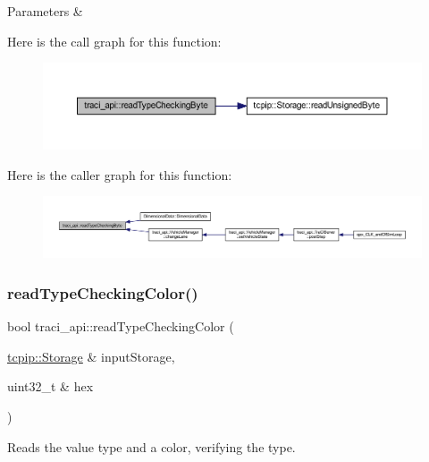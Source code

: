 \begin{DoxyParams}{Parameters}
{\em } & \\
\hline
\end{DoxyParams}
Here is the call graph for this function\+:
\nopagebreak
\begin{figure}[H]
\begin{center}
\leavevmode
\includegraphics[width=350pt]{namespacetraci__api_aee58441392da7b83ecd8c8831271e945_cgraph}
\end{center}
\end{figure}
Here is the caller graph for this function\+:
\nopagebreak
\begin{figure}[H]
\begin{center}
\leavevmode
\includegraphics[width=350pt]{namespacetraci__api_aee58441392da7b83ecd8c8831271e945_icgraph}
\end{center}
\end{figure}
\mbox{\label{namespacetraci__api_af8c7656fbd212acb13f037d4fb20f1f7}} 
\subsubsection{\texorpdfstring{read\+Type\+Checking\+Color()}{readTypeCheckingColor()}}
{\footnotesize\ttfamily bool traci\+\_\+api\+::read\+Type\+Checking\+Color (\begin{DoxyParamCaption}\item[{\hyperlink{classtcpip_1_1_storage}{tcpip\+::\+Storage} \&}]{input\+Storage,  }\item[{uint32\+\_\+t \&}]{hex }\end{DoxyParamCaption})}



Reads the value type and a color, verifying the type. 


